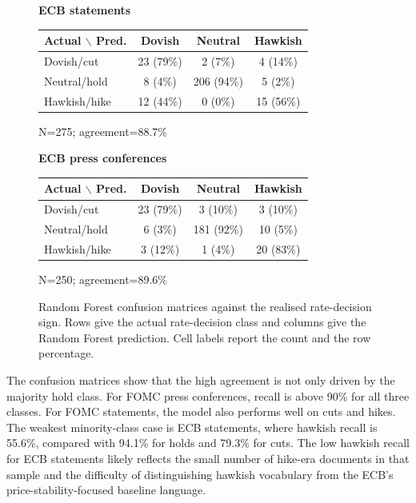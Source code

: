 \begin{figure}[H]
\vspace{0.25cm}
\begin{minipage}{0.48\textwidth}
\centering
\scriptsize
\textbf{ECB statements}\par
\vspace{0.08cm}
\begin{tabular}{lccc}
\toprule
Actual $\backslash$ Pred. & Dovish & Neutral & Hawkish \\
\midrule
Dovish/cut & 23 (79\%) & 2 (7\%) & 4 (14\%) \\
Neutral/hold & 8 (4\%) & 206 (94\%) & 5 (2\%) \\
Hawkish/hike & 12 (44\%) & 0 (0\%) & 15 (56\%) \\
\bottomrule
\end{tabular}
\vspace{0.05cm}
\par N=275; agreement=88.7\%
\end{minipage}
\hfill
\begin{minipage}{0.48\textwidth}
\centering
\scriptsize
\textbf{ECB press conferences}\par
\vspace{0.08cm}
\begin{tabular}{lccc}
\toprule
Actual $\backslash$ Pred. & Dovish & Neutral & Hawkish \\
\midrule
Dovish/cut & 23 (79\%) & 3 (10\%) & 3 (10\%) \\
Neutral/hold & 6 (3\%) & 181 (92\%) & 10 (5\%) \\
Hawkish/hike & 3 (12\%) & 1 (4\%) & 20 (83\%) \\
\bottomrule
\end{tabular}
\vspace{0.05cm}
\par N=250; agreement=89.6\%
\end{minipage}
  \caption[Random Forest confusion matrices]{Random Forest confusion matrices
    against the realised rate-decision sign. Rows give the actual rate-decision
    class and columns give the Random Forest prediction. Cell labels report the
    count and the row percentage.}
  \label{fig:rf_confusion_v31}
\end{figure}

The confusion matrices show that the high agreement is not only driven by the
majority hold class. For FOMC press conferences, recall is above 90\% for all
three classes. For FOMC statements, the model also performs well on cuts and
hikes. The weakest minority-class case is ECB statements, where hawkish recall
is 55.6\%, compared with 94.1\% for holds and 79.3\% for cuts. The low
hawkish recall for ECB statements likely reflects the small number of
hike-era documents in that sample and the difficulty of distinguishing hawkish
vocabulary from the ECB's price-stability-focused baseline language.

